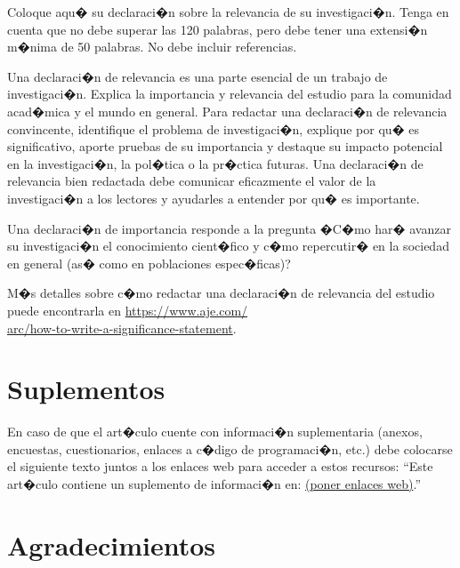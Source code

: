 \documentclass[10pt,twoside]{rcmart} %
\begin{document}
	Coloque aqu� su declaraci�n sobre la relevancia de su investigaci�n. Tenga en cuenta que no debe superar las 120 palabras, pero debe tener una extensi�n m�nima de 50 palabras. No debe incluir referencias.
	
	Una declaraci�n de relevancia es una parte esencial de un trabajo de investigaci�n. Explica la importancia y relevancia del estudio para la comunidad acad�mica y el mundo en general. Para redactar una declaraci�n de relevancia convincente, identifique el problema de investigaci�n, explique por qu� es significativo, aporte pruebas de su importancia y destaque su impacto potencial en la investigaci�n, la pol�tica o la pr�ctica futuras. Una declaraci�n de relevancia bien redactada debe comunicar eficazmente el valor de la investigaci�n a los lectores y ayudarles a entender por qu� es importante.
	
	Una declaraci�n de importancia responde a la pregunta �C�mo har� avanzar su investigaci�n el conocimiento cient�fico y c�mo repercutir� en la sociedad en general (as� como en poblaciones espec�ficas)? 
	
	M�s detalles sobre c�mo redactar una declaraci�n de relevancia del estudio puede encontrarla en \href{https://www.aje.com/arc/how-to-write-a-significance-statement}{https://www.aje.com/\\arc/how-to-write-a-significance-statement}.

\section*{Suplementos} %
	
	En caso de que el art�culo cuente con informaci�n suplementaria (anexos, encuestas, cuestionarios, enlaces a c�digo de programaci�n, etc.) debe colocarse el siguiente texto juntos a los enlaces web para acceder a estos recursos: ``Este art�culo contiene un suplemento de informaci�n en: \underline{(poner enlaces web)}.''

\section*{Agradecimientos} %
	
\end{document}
